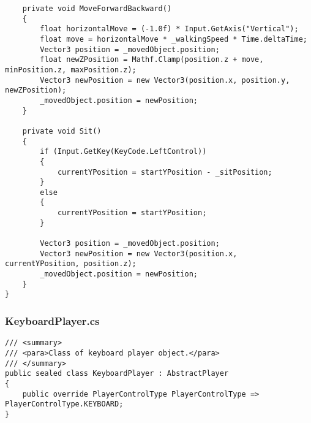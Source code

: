 \begin{verbatim}
    private void MoveForwardBackward()
    {
        float horizontalMove = (-1.0f) * Input.GetAxis("Vertical");
        float move = horizontalMove * _walkingSpeed * Time.deltaTime;
        Vector3 position = _movedObject.position;
        float newZPosition = Mathf.Clamp(position.z + move, minPosition.z, maxPosition.z);
        Vector3 newPosition = new Vector3(position.x, position.y, newZPosition);
        _movedObject.position = newPosition;
    }

    private void Sit()
    {
        if (Input.GetKey(KeyCode.LeftControl))
        {
            currentYPosition = startYPosition - _sitPosition;
        }
        else
        {
            currentYPosition = startYPosition;
        }

        Vector3 position = _movedObject.position;
        Vector3 newPosition = new Vector3(position.x, currentYPosition, position.z);
        _movedObject.position = newPosition;
    }
}
\end{verbatim}
\subsubsection*{KeyboardPlayer.cs}
\begin{verbatim}
/// <summary>
/// <para>Class of keyboard player object.</para>
/// </summary>
public sealed class KeyboardPlayer : AbstractPlayer
{
    public override PlayerControlType PlayerControlType => PlayerControlType.KEYBOARD;
}
\end{verbatim}
